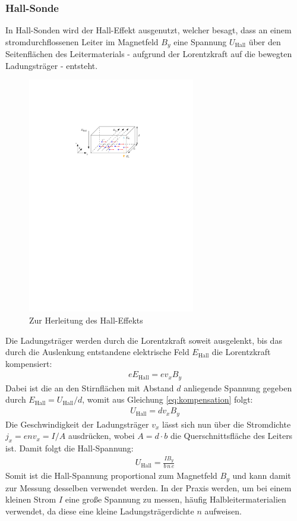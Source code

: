 \documentclass[11pt, a4paper]{article}
\begin{document}
\subsubsection{Hall-Sonde}
In Hall-Sonden wird der Hall-Effekt ausgenutzt, welcher besagt, dass an einem stromdurchflossenen Leiter im Magnetfeld $B_y$ eine Spannung $U_\mathrm{Hall}$ über den Seitenflächen des Leitermaterials - aufgrund der Lorentzkraft auf die bewegten Ladungsträger - entsteht.
\begin{figure}[h]
	\centering
	\includegraphics[width=0.65\textwidth]{./figures/hall_effekt.pdf}
	\caption{Zur Herleitung des Hall-Effekts}
	\label{fig:hall_effekt}
\end{figure}
Die Ladungsträger werden durch die Lorentzkraft soweit ausgelenkt, bis das durch die Auslenkung entstandene elektrische Feld $E_\mathrm{Hall}$ die Lorentzkraft kompensiert:
\begin{align*}
	e E_\mathrm{Hall} = e v_x B_y
	\label{eq:kompensation}
\end{align*}
Dabei ist die an den Stirnflächen mit Abstand $d$ anliegende Spannung gegeben durch $E_\mathrm{Hall} = U_\mathrm{Hall} / d$, womit aus Gleichung \ref{eq:kompensation} folgt:
\begin{align*}
	U_\mathrm{Hall} = d v_x B_y
\end{align*}
Die Geschwindigkeit der Ladungsträger $v_x$ lässt sich nun über die Stromdichte $j_x = e n v_x = I/A$ ausdrücken, wobei $A = d \cdot b$ die Querschnittsfläche des Leiters ist.
Damit folgt die Hall-Spannung:
\begin{align*}
	U_\mathrm{Hall} = \frac{I B_y}{b\, n\, e}
\end{align*}
Somit ist die Hall-Spannung proportional zum Magnetfeld $B_y$ und kann damit zur Messung desselben verwendet werden.
In der Praxis werden, um bei einem kleinen Strom $I$ eine große Spannung zu messen, häufig Halbleitermaterialien verwendet, da diese eine kleine Ladungsträgerdichte $n$ aufweisen.
\end{document}
